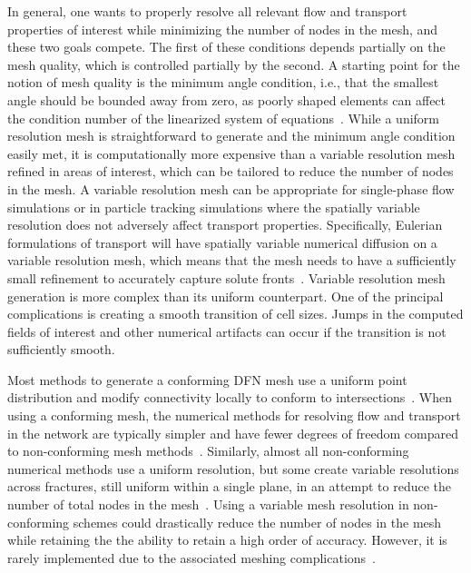 \documentclass[preprint, 10pt]{elsarticle}
\theoremstyle{definition}
\theoremstyle{remark}
\begin{document}
In general, one wants to properly resolve all relevant flow and transport properties of interest while minimizing the number of nodes in the mesh, and these two goals compete.
The first of these conditions depends partially on the mesh quality, which is controlled partially by the second.
A starting point for the notion of mesh quality is the minimum angle condition, i.e., that the smallest angle should be bounded away from zero, as poorly shaped elements can affect the condition number of the linearized system of equations~\cite{azis,strangfix,ZLAMAL}. 
While a uniform resolution mesh is straightforward to generate and the minimum angle condition easily met, it is computationally more expensive than a variable resolution mesh refined in areas of interest, which can be tailored to reduce the number of nodes in the mesh.
A variable resolution mesh can be appropriate for single-phase flow simulations or in particle tracking simulations where the spatially variable resolution does not adversely affect transport properties.
Specifically, Eulerian formulations of transport will have spatially variable numerical diffusion on a variable resolution mesh, which means that the mesh needs to have a sufficiently small refinement to accurately capture solute fronts~\cite{benson2017comparison}.
Variable resolution mesh generation is more complex than its uniform counterpart. 
One of the principal complications is creating a smooth transition of cell sizes. 
Jumps in the computed fields of interest and other numerical artifacts can occur if the transition is not sufficiently smooth.

Most methods to generate a conforming DFN mesh use a uniform point distribution and modify connectivity locally to conform to intersections~\cite{mustapha2007new,mustapha2011efficient}.
When using a conforming mesh, the numerical methods for resolving flow and transport in the network are typically simpler and have fewer degrees of freedom compared to non-conforming mesh methods~\cite{fumagalli2019conforming}.  
Similarly, almost all non-conforming numerical methods use a uniform resolution, but some create variable resolutions across fractures, still uniform within a single plane, in an attempt to reduce the number of total nodes in the mesh~\cite{berrone2019parallel}.
Using a variable mesh resolution in non-conforming schemes could drastically reduce the number of nodes in the mesh while retaining the the ability to retain a high order of accuracy. 
However, it is rarely implemented due to the associated meshing complications~\cite{borio2021comparison}.
\end{document}
